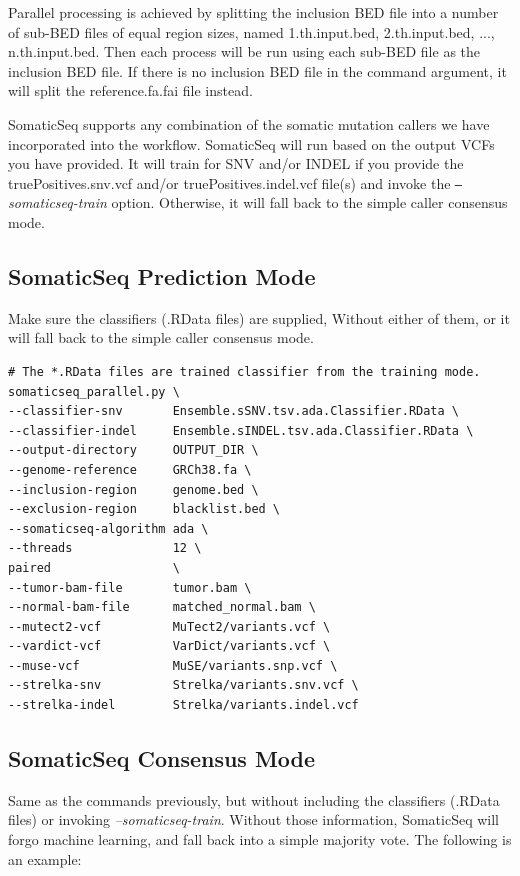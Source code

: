 \documentclass[10pt,letterpaper]{article}
\begin{document}
\begin{sloppypar}
Parallel processing is achieved by splitting the inclusion BED file into a number of sub-BED files of equal region sizes, named 1.th.input.bed, 2.th.input.bed, ..., n.th.input.bed. Then each process will be run using each sub-BED file as the inclusion BED file. If there is no inclusion BED file in the command argument, it will split the reference.fa.fai file instead. 

SomaticSeq supports any combination of the somatic mutation callers we have incorporated into the workflow. SomaticSeq will run based on the output VCFs you have provided. It will train for SNV and/or INDEL if you provide the truePositives.snv.vcf and/or truePositives.indel.vcf file(s) and invoke the \textit{\texttt{--}somaticseq-train} option. Otherwise, it will fall back to the simple caller consensus mode.




\subsection{SomaticSeq Prediction Mode} \label{somaticseq_prediction}

Make sure the classifiers (.RData files) are supplied, Without either of them, or it will fall back to the simple caller consensus mode.

\begin{lstlisting}
# The *.RData files are trained classifier from the training mode.
somaticseq_parallel.py \
--classifier-snv       Ensemble.sSNV.tsv.ada.Classifier.RData \
--classifier-indel     Ensemble.sINDEL.tsv.ada.Classifier.RData \
--output-directory     OUTPUT_DIR \
--genome-reference     GRCh38.fa \
--inclusion-region     genome.bed \
--exclusion-region     blacklist.bed \
--somaticseq-algorithm ada \
--threads              12 \
paired                 \
--tumor-bam-file       tumor.bam \
--normal-bam-file      matched_normal.bam \
--mutect2-vcf          MuTect2/variants.vcf \
--vardict-vcf          VarDict/variants.vcf \
--muse-vcf             MuSE/variants.snp.vcf \
--strelka-snv          Strelka/variants.snv.vcf \
--strelka-indel        Strelka/variants.indel.vcf
\end{lstlisting}



\subsection{SomaticSeq Consensus Mode} \label{somaticseq_default_mode}

Same as the commands previously, but without including the classifiers (.RData files) or invoking \textit{--somaticseq-train}. Without those information, SomaticSeq will forgo machine learning, and fall back into a simple majority vote. The following is an example:


\end{sloppypar}
\end{document}
